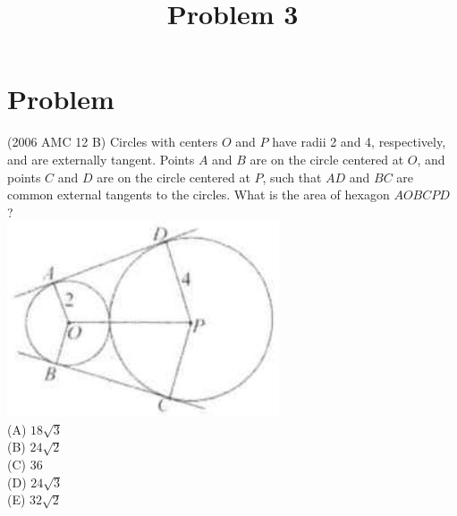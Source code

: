 \documentclass{article}
\title{Problem 3}
\date{}
\begin{document}
\maketitle

\section*{Problem}
(2006 AMC 12 B) Circles with centers \(O\) and \(P\) have radii 2 and 4, respectively, and are externally tangent. Points \(A\) and \(B\) are on the circle centered at \(O\), and points \(C\) and \(D\) are on the circle centered at \(P\), such that \(A D\) and \(B C\) are common external tangents to the circles. What is the area of hexagon \(A O B C P D\) ?\\
\centering
\includegraphics[width=\textwidth]{images/problem_image_1.jpg}\\
(A) \(18 \sqrt{3}\)\\
(B) \(24 \sqrt{2}\)\\
(C) 36\\
(D) \(24 \sqrt{3}\)\\
(E) \(32 \sqrt{2}\)
\end{document}
